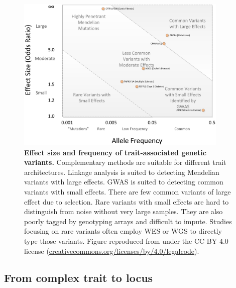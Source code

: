 \begin{outline}
\begin{figure}
    \centering
    \includegraphics[width=0.9\textwidth,page=1]{mainmatter/figures/chapter_01/bush2012Chapter11GenomeWide/journal.pcbi.1002822.g001.png}
    \caption{
        \textbf{Effect size and frequency of trait-associated genetic variants.}
        Complementary methods are suitable for different trait architectures.
        Linkage analysis is suited to detecting Mendelian variants with large effects.
        \gls{GWAS} is suited to detecting common variants with small effects.
        There are few common variants of large effect  due to selection.
        Rare variants with small effects are hard to distinguish from noise without very large samples.
        They are also poorly tagged by genotyping arrays and difficult to impute.
        Studies focusing on rare variants often employ \gls{WES} or \gls{WGS} to directly type those variants.
        Figure reproduced from \textcite{bush2012Chapter11GenomeWide} under the CC BY 4.0 license (\url{creativecommons.org/licenses/by/4.0/legalcode}).
    }
    \label{fig:intro_effectSizeVsFrequency}
\end{figure}

\subsection{From complex trait to locus}


\end{outline}

